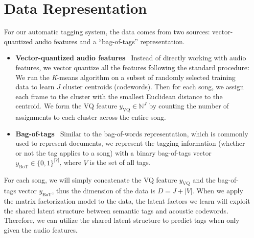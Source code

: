 \section{Data Representation} \label{sec:data}
For our automatic tagging system, the data comes from two sources: vector-quantized audio features and a ``bag-of-tags'' representation. 
\begin{itemize}
\item \textbf{Vector-quantized audio features}
~Instead of directly working with audio features, we vector quantize all the features following the standard procedure: We run the \emph{K}-means algorithm on a subset of randomly selected training data to learn $J$ cluster centroids (codewords). Then for each song, we assign each frame to the cluster with the smallest Euclidean distance to the centroid. We form the VQ feature $y_{\text{VQ}} \in \mathbb{N}^J$ by counting the number of assignments to each cluster across the entire song. 

\item \textbf{Bag-of-tags}
~Similar to the bag-of-words representation, which is commonly used to represent documents, we represent the tagging information (whether or not the tag applies to a song) with a binary bag-of-tags vector $y_{\text{BoT}}\in \{0, 1\}^{|V|}$, where $V$ is the set of all tags. \end{itemize}

For each song, we will simply concatenate the VQ feature $y_{\text{VQ}}$ and the bag-of-tags vector $y_{\text{BoT}}$, thus the dimension of the data is $D = J + |V|$. When we apply the matrix factorization model to the data, the latent factors we learn will exploit the shared latent structure between semantic tags and acoustic codewords. Therefore, we can utilize the shared latent structure to predict tags when only given the audio features. 

